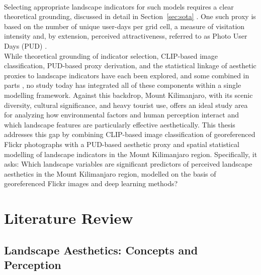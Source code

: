 \documentclass[hidelinks, 11pt]{article}
\begin{document}
\\
Selecting appropriate landscape indicators for such models requires a clear theoretical grounding, discussed in detail in Section~\ref{sec:sota} \citep{ode_capturing_2008,tribot_integrating_2018}. One such proxy is based on the number of unique user-days per grid cell, a measure of visitation intensity and, by extension, perceived attractiveness, referred to as Photo User Days (PUD) \citep{wood_using_2013}.
\\
While theoretical grounding of indicator selection, CLIP-based image classification, PUD-based proxy derivation, and the statistical linkage of aesthetic proxies to landscape indicators have each been explored, and some combined in parts \citep{liao_oneshot_2025,liao_mapping_2025,vaz_digital_2020}, no study today has integrated all of these components within a single modelling framework. Against this backdrop, Mount Kilimanjaro, with its scenic diversity, cultural significance, and heavy tourist use, offers an ideal study area for analyzing how environmental factors and human perception interact and which landscape features are particularly effective aesthetically. This thesis addresses this gap by combining CLIP-based image classification of georeferenced Flickr photographs with a PUD-based aesthetic proxy and spatial statistical modelling of landscape indicators in the Mount Kilimanjaro region. Specifically, it asks: Which landscape variables are significant predictors of perceived landscape aesthetics in the Mount Kilimanjaro region, modelled on the basis of georeferenced Flickr images and deep learning methods?
\section{Literature Review}\label{sec:Einleitung}

\subsection{Landscape Aesthetics: Concepts and Perception}\label{sec:LAConcepts}
\end{document}

